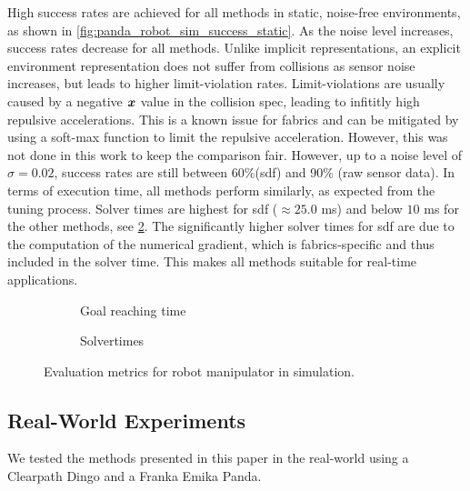 High success rates are achieved for all methods in static,
noise-free environments, as shown in \cref{fig:panda_robot_sim_success_static}.
As the noise level increases, success rates decrease for all
methods. Unlike implicit representations, an explicit environment
representation does not suffer from collisions as sensor
noise increases, but leads to higher limit-violation rates. 
Limit-violations are usually caused by a negative $\bm{x}$ value
in the collision spec, leading to infititly high repulsive
accelerations. 
This is a known issue for \ac{fabrics} and can be
mitigated by using a soft-max function to limit the
repulsive acceleration. However, this was not done in this
work to keep the comparison fair.
However, up to a noise level of
$\sigma=0.02$, success rates are still between
60\%(\ac{sdf}) and 90\% (raw sensor data). In terms of
execution time, all methods perform similarly, as expected
from the tuning process. Solver times are highest for
\ac{sdf} ($\approx 25.0$ ms) and below $10$ ms for the 
other methods, see \cref{subfig:panda_sim_solvertimes}.
The significantly higher solver times for \ac{sdf} are due
to the computation of the numerical gradient, which is
\ac{fabrics}-specific and thus included in the solver time.
This makes all methods suitable for real-time applications.
%
\begin{figure}[ht]
  \centering
  \begin{subfigure}{0.5\linewidth}
    \centering
    
    \caption{Goal reaching time}%
    \label{subfig:panda_sim_time2Goal}
  \end{subfigure}%
  \begin{subfigure}{0.5\linewidth}
    \centering
    
    \caption{Solvertimes}%
    \label{subfig:panda_sim_solvertimes}
  \end{subfigure}%
  \caption{Evaluation metrics for robot manipulator in
    simulation.
  }%
  \label{fig:panda_sim_metrics}
\end{figure}

\subsection{Real-World Experiments} %
\label{sub:real_world_experiments}
%
We tested the methods presented in this paper in the
real-world using a Clearpath Dingo and a Franka
Emika Panda. 

